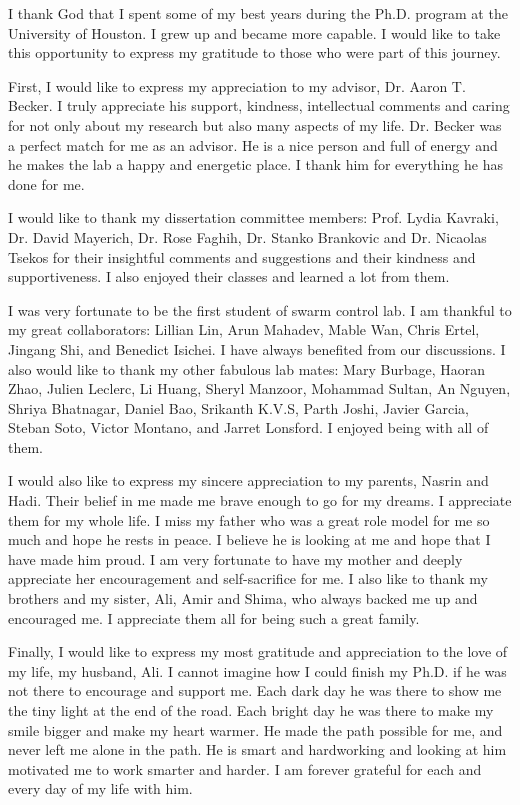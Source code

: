 



I thank God that I spent some of my best years during the Ph.D. program at the University of Houston. I grew up and became more capable. I would like to take this opportunity to express my gratitude to those who were part of this journey.

First, I would like to express my appreciation to my advisor, Dr. Aaron T. Becker. I truly appreciate his support, kindness, intellectual comments and caring for not only about my research but also many aspects of my life. Dr. Becker was a perfect match for me as an advisor. He is a nice person and full of energy and he makes the lab a happy and energetic place. I thank him for everything he has done for me.

I would like to thank my dissertation committee members: Prof. Lydia Kavraki, Dr. David Mayerich, Dr. Rose Faghih, Dr. Stanko Brankovic and Dr. Nicaolas Tsekos for their insightful comments and suggestions and their kindness and supportiveness. I also enjoyed their classes and learned a lot from them.

I was very fortunate to be the first student of swarm control lab. I am thankful to my great collaborators: Lillian Lin, Arun Mahadev, Mable Wan, Chris Ertel, Jingang Shi, and Benedict Isichei. I have always benefited from our discussions. I also would like to thank my other fabulous lab mates: Mary Burbage, Haoran Zhao, Julien Leclerc, Li Huang, Sheryl Manzoor, Mohammad Sultan, An Nguyen, Shriya Bhatnagar, Daniel Bao, Srikanth K.V.S, Parth Joshi, Javier Garcia, Steban Soto, Victor Montano, and Jarret Lonsford. I enjoyed being with all of them.

I would also like to express my sincere appreciation to my parents, Nasrin and Hadi. Their belief in me made me brave enough to go for my dreams. I appreciate them for my whole life. I miss my father who was a great role model for me so much and hope he rests in peace. I believe he is looking at me and hope that I have made him proud. I am very fortunate to have my mother and deeply appreciate her encouragement and self-sacrifice for me. I also like to thank my brothers and my sister, Ali, Amir and Shima, who always backed me up and encouraged me. I appreciate them all for being such a great family.

Finally, I would like to express my most gratitude and appreciation to the love of my life, my husband, Ali. I cannot imagine how I could finish my Ph.D. if he was not there to encourage and support me. Each dark day he was there to show me the tiny light at the end of the road. Each bright day he was there to make my smile bigger and make my heart warmer. He made the path possible for me, and never left me alone in the path. He is smart and hardworking and looking at him motivated me to work smarter and harder. I am forever grateful for each and every day of my life with him.


